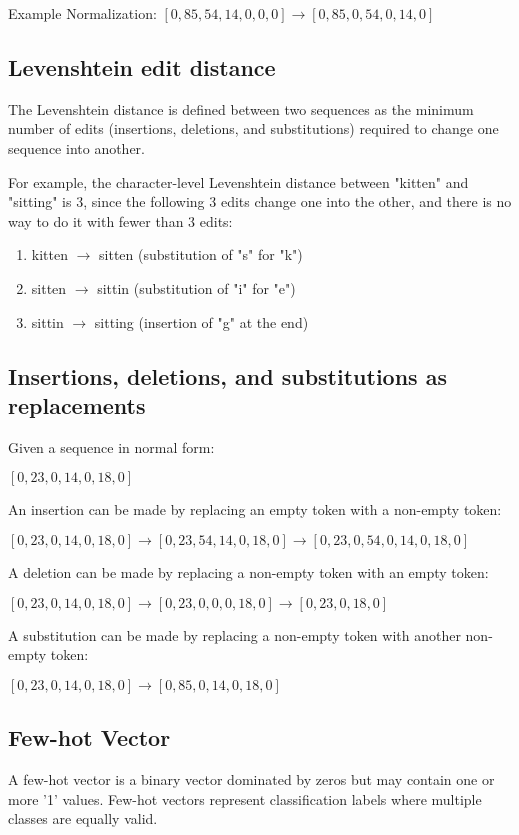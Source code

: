 \documentclass{article}
\begin{document}
\vspace*{1em}
\noindent Example Normalization: $[0, 85, 54, 14, 0, 0, 0] \rightarrow [0, 85, 0, 54, 0, 14, 0]$
\vspace*{1em}

\subsection{Levenshtein edit distance}
The Levenshtein distance is defined between two sequences as the minimum number of edits (insertions, deletions, and substitutions) required to change one sequence into another.

For example, the character-level Levenshtein distance between "kitten" and "sitting" is 3, since the following 3 edits change one into the other, and there is no way to do it with fewer than 3 edits:
\begin{enumerate}
    \item{kitten $\rightarrow$ sitten (substitution of "s" for "k")}
    \item{sitten $\rightarrow$ sittin (substitution of "i" for "e")}
    \item{sittin $\rightarrow$ sitting (insertion of "g" at the end)}
\end{enumerate}

\subsection{Insertions, deletions, and substitutions as replacements}
Given a sequence in normal form:

$[0, 23, 0, 14, 0, 18, 0]$

An insertion can be made by replacing an empty token with a non-empty token:

$[0, 23, 0, 14, 0, 18, 0] \rightarrow [0, 23, 54, 14, 0, 18, 0] \rightarrow [0, 23, 0, 54, 0, 14, 0, 18, 0]$

A deletion can be made by replacing a non-empty token with an empty token:

$[0, 23, 0, 14, 0, 18, 0] \rightarrow [0, 23, 0, 0, 0, 18, 0] \rightarrow [0, 23, 0, 18, 0]$

A substitution can be made by replacing a non-empty token with another non-empty token:

$[0, 23, 0, 14, 0, 18, 0] \rightarrow [0, 85, 0, 14, 0, 18, 0]$

\subsection{Few-hot Vector}
A few-hot vector is a binary vector dominated by zeros but may contain one or more '1' values. Few-hot vectors represent classification labels where multiple classes are equally valid.
\end{document}
